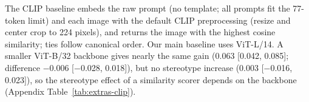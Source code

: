 The CLIP baseline embeds the raw prompt (no template; all prompts fit the 77-token limit) and each image with the default CLIP preprocessing (resize and center crop to 224 pixels), and returns the image with the highest cosine similarity; ties follow canonical order. Our main baseline uses ViT-L/14. A smaller ViT-B/32 backbone gives nearly the same gain (0.063 [0.042, 0.085]; difference $-$0.006 [$-$0.028, 0.018]), but no stereotype increase (0.003 [$-$0.016, 0.023]), so the stereotype effect of a similarity scorer depends on the backbone (Appendix Table~\ref{tab:extras-clip}).
